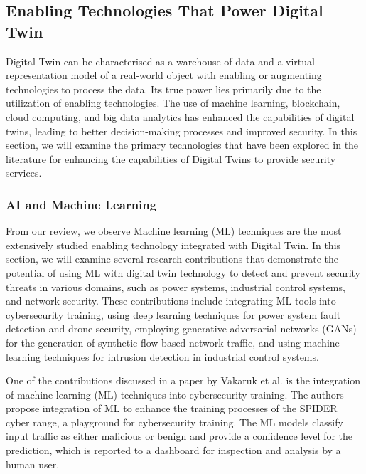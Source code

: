 
%
\subsection{Enabling Technologies That Power Digital Twin}
Digital Twin can be characterised as a warehouse of data and a virtual representation model of a real-world object with enabling or augmenting technologies to process the data. Its true power lies primarily due to the utilization of enabling technologies\cite{sousaELEGANTSecurityCritical2021}. The use of machine learning, blockchain, cloud computing, and big data analytics has enhanced the capabilities of digital twins, leading to better decision-making processes and improved security. In this section, we will examine the primary technologies that have been explored in the literature for enhancing the capabilities of Digital Twins to provide security services.

\subsubsection{AI and Machine Learning}
From our review, we observe Machine learning (ML) techniques are the most extensively studied enabling technology integrated with Digital Twin. 
In this section, we will examine several research contributions that demonstrate the potential of using ML with digital twin technology to detect and prevent security threats in various domains, such as power systems, industrial control systems, and network security. These contributions include integrating ML tools into cybersecurity training, using deep learning techniques for power system fault detection and drone security, employing generative adversarial networks (GANs) for the generation of synthetic flow-based network traffic, and using machine learning techniques for intrusion detection in industrial control systems.
  
One of the contributions discussed in a paper by Vakaruk et al.\cite{vakarukDigitalTwinNetwork2021} is the integration of machine learning (ML) techniques into cybersecurity training. The authors propose integration of ML to enhance the training processes of the SPIDER cyber range, a playground for cybersecurity training. The ML models classify input traffic as either malicious or benign and provide a confidence level for the prediction, which is reported to a dashboard for inspection and analysis by a human user.


